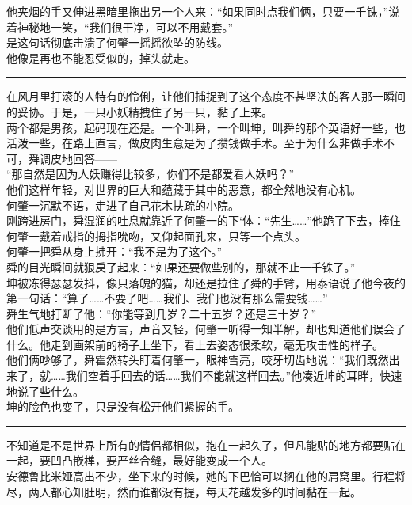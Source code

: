 \documentclass[oneside,11pt]{memoir} %
\begin{document}
\begin{CJK}{UTF8}{gbsn}
    他夹烟的手又伸进黑暗里拖出另一个人来：“如果同时点我们俩，只要一千铢，”说着神秘地一笑，“我们很干净，可以不用戴套。”    \\\indent
    是这句话彻底击溃了何肇一摇摇欲坠的防线。\\\indent
    他像是再也不能忍受似的，掉头就走。\\\indent
\rule{-3pt}{30pt}
    在风月里打滚的人特有的伶俐，让他们捕捉到了这个态度不甚坚决的客人那一瞬间的妥协。于是，一只小妖精拽住了另一只，黏了上来。\\\indent
    两个都是男孩，起码现在还是。一个叫舜，一个叫坤，叫舜的那个英语好一些，也活泼一些，在路上直言，做皮肉生意是为了攒钱做手术。至于为什么非做手术不可，舜调皮地回答——\\\indent
    “那自然是因为人妖赚得比较多，你们不是都爱看人妖吗？”\\\indent
    他们这样年轻，对世界的巨大和蕴藏于其中的恶意，都全然地没有心机。\\\indent
    何肇一沉默不语，走进了自己花木扶疏的小院。\\\indent
    刚跨进房门，舜湿润的吐息就靠近了何肇一的下`体：“先生……”他跪了下去，捧住何肇一戴着戒指的拇指吮吻，又仰起面孔来，只等一个点头。\\\indent
    何肇一把舜从身上拂开：“我不是为了这个。”\\\indent
    舜的目光瞬间就狠戾了起来：“如果还要做些别的，那就不止一千铢了。”\\\indent
    坤被冻得瑟瑟发抖，像只落魄的猫，却还是拉住了舜的手臂，用泰语说了他今夜的第一句话：“算了……不要了吧……我们、我们也没有那么需要钱……”\\\indent
    舜生气地打断了他：“你能等到几岁？二十五岁？还是三十岁？”\\\indent
    他们低声交谈用的是方言，声音又轻，何肇一听得一知半解，却也知道他们误会了什么。他走到画架前的椅子上坐下，看上去姿态很柔软，毫无攻击性的样子。\\\indent
    他们俩吵够了，舜霍然转头盯着何肇一，眼神雪亮，咬牙切齿地说：“我们既然出来了，就……我们空着手回去的话……我们不能就这样回去。”他凑近坤的耳畔，快速地说了些什么。\\\indent
    坤的脸色也变了，只是没有松开他们紧握的手。\\\indent
\rule{-3pt}{30pt}
    不知道是不是世界上所有的情侣都相似，抱在一起久了，但凡能贴的地方都要贴在一起，要凹凸嵌榫，要严丝合缝，最好能变成一个人。\\\indent
    安德鲁比米娅高出不少，坐下来的时候，她的下巴恰可以搁在他的肩窝里。行程将尽，两人都心知肚明，然而谁都没有提，每天花越发多的时间黏在一起。\\\indent

\end{CJK}
\end{document}
